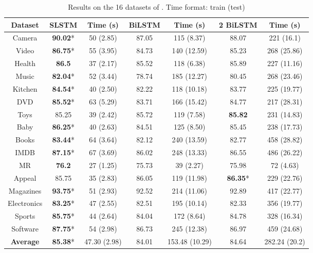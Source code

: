 \documentclass[11pt,a4paper]{article}
\begin{document}
\begin{table*}[t]
	\centering
\begin{tabular}{cccc|c|c|c|c|c|c|}
		\hline
		\multicolumn{4}{|c|}{\textbf{Dataset}}& \textbf{SLSTM}&\textbf{Time (s)}&\textbf{BiLSTM} &\textbf{Time (s)}&\textbf{2 BiLSTM} &\textbf{Time (s)}\\
		\hline
		\multicolumn{4}{|c|}{Camera}&\textbf{90.02}*&50 (2.85)&87.05&115 (8.37)&88.07&221 (16.1)\\
		\multicolumn{4}{|c|}{Video}&\textbf{86.75}*&55 (3.95)&84.73&140 (12.59)&85.23&268 (25.86)\\
		\multicolumn{4}{|c|}{Health}&\textbf{86.5}&37 (2.17)&85.52&118 (6.38)&85.89&227 (11.16)\\
		\multicolumn{4}{|c|}{Music}&\textbf{82.04}*&52 (3.44)&78.74&185 (12.27)&80.45&268 (23.46)\\
		\multicolumn{4}{|c|}{Kitchen}&\textbf{84.54}*&40 (2.50)&82.22&118 (10.18)&83.77&225 (19.77)\\
		\multicolumn{4}{|c|}{DVD}&\textbf{85.52}*&63 (5.29)&83.71&166 (15.42)&84.77&217 (28.31)\\
		\multicolumn{4}{|c|}{Toys}&85.25&39 (2.42)&85.72&119 (7.58)&\textbf{85.82}&231 (14.83)\\
		\multicolumn{4}{|c|}{Baby}&\textbf{86.25}*&40 (2.63)&84.51&125 (8.50)&85.45&238 (17.73)\\
		\multicolumn{4}{|c|}{Books}&\textbf{83.44}*&64 (3.64)&82.12&240 (13.59)&82.77&458 (28.82)\\
		\multicolumn{4}{|c|}{IMDB}&\textbf{87.15}*&67 (3.69)&86.02&248 (13.33)&86.55&486 (26.22)\\
		\multicolumn{4}{|c|}{MR}&\textbf{76.2}&27 (1.25)&75.73&39 (2.27)&75.98&72 (4.63)\\
		\multicolumn{4}{|c|}{Appeal}&85.75&35 (2.83)&86.05&119 (11.98)&\textbf{86.35}*&229 (22.76)\\
		\multicolumn{4}{|c|}{Magazines}&\textbf{93.75}*&51 (2.93)&92.52&214 (11.06)&92.89&417 (22.77)\\
		\multicolumn{4}{|c|}{Electronics}&\textbf{83.25}*&47 (2.55)&82.51&195 (10.14)&82.33&356 (19.77)\\
		\multicolumn{4}{|c|}{Sports}&\textbf{85.75}*&44 (2.64)&84.04&172 (8.64)&84.78&328 (16.34)\\
		\multicolumn{4}{|c|}{Software}&\textbf{87.75}*&54 (2.98)&86.73&245 (12.38)&86.97&459 (24.68)\\
		\hline
		\multicolumn{4}{|c|}{\textbf{Average}} &\textbf{85.38}*&47.30 (2.98)&84.01&153.48 (10.29)&84.64&282.24 (20.2)\\
		\hline
	\end{tabular}
	\caption{\label{classification}Results on the 16 datasets of . Time format: train (test)}
\end{table*}
\end{document}
